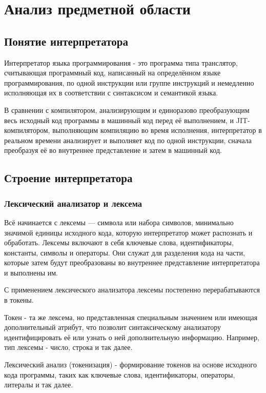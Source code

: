 \section{Анализ предметной области}

\subsection{Понятие интерпретатора}

Интерпретатор языка программирования - это программа типа транслятор, считывающая программный код, написанный на определённом языке программирования, по одной инструкции или группе инструкций и немедленно исполняющая их в соответствии с синтаксисом и семантикой языка.

В сравнении с компилятором, анализирующим и единоразово преобразующим весь исходный код программы в машинный код перед её выполнением, и JIT-компилятором, выполняющим компиляцию во время исполнения, интерпретатор в реальном времени анализирует и выполняет код по одной инструкции, сначала преобразуя её во внутреннее представление и затем в машинный код.



\subsection{Строение интерпретатора}

\subsubsection{Лексический анализатор и лексема}
Всё начинается с лексемы — символа или набора символов, минимально значимой единицы исходного кода, которую интерпретатор может распознать и обработать. Лексемы включают в себя ключевые слова, идентификаторы, константы, символы и операторы. Они служат для разделения кода на части, которые затем будут преобразованы во внутреннее представление интерпретатора и выполнены им.

С применением лексического анализатора лексемы постепенно перерабатываются в токены.

Токен - та же лексема, но представленная специальным значением или имеющая дополнительный атрибут, что позволит синтаксическому анализатору идентифицировать её или узнать о ней дополнительную информацию. Например, тип лексемы - число, строка и так далее.

Лексический анализ (токенизация) - формирование токенов на основе исходного кода программы, таких как ключевые слова, идентификаторы, операторы, литералы и так далее. 

